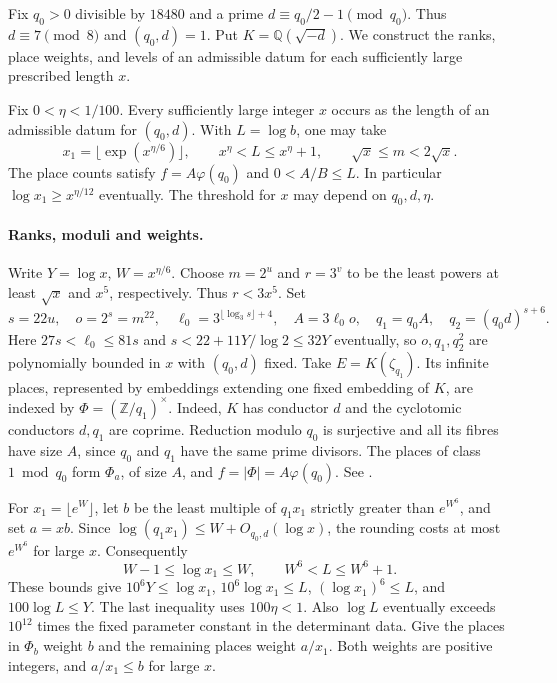 Fix $q_0>0$ divisible by $18480$ and a prime
$d\equiv q_0/2-1\pmod {q_0}$. Thus $d\equiv7\pmod8$ and
$(q_0,d)=1$. Put $K=\mathbb Q(\sqrt{-d})$.
We construct the ranks, place weights, and levels of an admissible datum for each sufficiently large prescribed length $x$.

\begin{theorem}\label{thm:p1-data}
Fix $0<\eta<1/100$. Every sufficiently large integer $x$ occurs as the
length of an admissible datum for $(q_0,d)$. With $L=\log b$, one may take
\begin{equation}\label{eq:p1-data-scale}
 x_1=\lfloor\exp(x^{\eta/6})\rfloor,\qquad
 x^\eta<L\le x^\eta+1,\qquad \sqrt{x}\le m<2\sqrt{x}.
\end{equation}
The place counts satisfy $f=A\varphi(q_0)$ and $0<A/B\le L$.
In particular $\log x_1\ge x^{\eta/12}$ eventually. The threshold for $x$
may depend on $q_0,d,\eta$.
\end{theorem}

\paragraph{Ranks, moduli and weights.}
Write $Y=\log x$, $W=x^{\eta/6}$. Choose $m=2^u$ and $r=3^v$ to be the
least powers at least $\sqrt{x}$ and $x^5$, respectively. Thus
$r<3x^5$. Set
\[
 s=22u,\quad o=2^s=m^{22},\quad
 \ell_0=3^{\lfloor\log_3s\rfloor+4},\quad
 A=3\ell_0 o,\quad q_1=q_0 A,\quad q_2=(q_0d)^{s+6}.
\]
Here $27s<\ell_0\le81s$ and $s<22+11Y/\log 2\le32Y$ eventually, so $o,q_1,q_2^2$ are
polynomially bounded in $x$ with $(q_0,d)$ fixed. Take
$E=K(\zeta_{q_1})$. Its infinite places, represented by embeddings
extending one fixed embedding of $K$, are indexed by
$\Phi=(\mathbb Z/q_1)^\times$. Indeed, $K$ has conductor $d$ and the
cyclotomic conductors $d,q_1$ are coprime. Reduction modulo $q_0$ is
surjective and all its fibres have size $A$, since $q_0$ and $q_1$
have the same prime divisors. The places of class $1\bmod q_0$ form
$\Phi_a$, of size $A$, and $f=|\Phi|=A\varphi(q_0)$.
See .

For $x_1=\lfloor e^W\rfloor$, let $b$ be the least multiple of $q_1x_1$
strictly greater than $e^{W^6}$, and set $a=xb$. Since
$\log(q_1x_1)\le W+O_{q_0,d}(\log x)$, the rounding costs at most
$e^{W^6}$ for large $x$. Consequently
\[
 W-1\le\log x_1\le W,\qquad W^6< L\le W^6+1.
\]
These bounds give
$10^6Y\le\log x_1$, $10^6\log x_1\le L$, $(\log x_1)^6\le L$,
and $100\log L\le Y$. The last inequality uses $100\eta<1$.
Also $\log L$ eventually exceeds $10^{12}$ times the fixed parameter
constant in the determinant data.
Give the places in $\Phi_b$ weight $b$ and the remaining places weight $a/x_1$. Both weights are positive integers, and $a/x_1\le b$ for large $x$.

